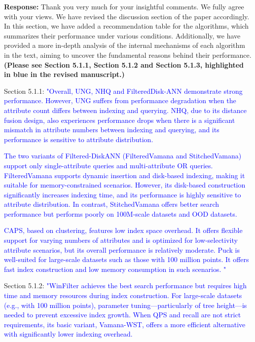 \documentclass[sigconf, nonacm]{acmart}
\newcounter{weakness}[section]
\begin{document}
\noindent
\textbf{Response:} 
%
Thank you very much for your insightful comments. We fully agree with your views. We have revised the discussion section of the paper accordingly. In this section, we have added a recommendation table for the algorithms, which summarizes their performance under various conditions. Additionally, we have provided a more in-depth analysis of the internal mechanisms of each algorithm in the text, aiming to uncover the fundamental reasons behind their performance.
\textbf{(Please see Section 5.1.1, Section 5.1.2 and Section 5.1.3, highlighted in blue in the revised manuscript.)}

Section 5.1.1:\textcolor{blue}{
	"Overall, UNG, NHQ and FilteredDisk-ANN demonstrate strong performance. However, UNG suffers from performance degradation when the attribute count differs between indexing and querying. NHQ, due to its distance fusion design, also experiences performance drops when there is a significant mismatch in attribute numbers between indexing and querying, and its performance is sensitive to attribute distribution. }

\textcolor{blue}{The two variants of Filtered-DiskANN (FilteredVamana and StitchedVamana) support only single-attribute queries and multi-attribute OR queries. FilteredVamana supports dynamic insertion and disk-based indexing, making it suitable for memory-constrained scenarios. However, its disk-based construction significantly increases indexing time, and its performance is highly sensitive to attribute distribution. In contrast, StitchedVamana offers better search performance but performs poorly on 100M-scale datasets and OOD datasets.}

\textcolor{blue}{
	CAPS, based on clustering, features low index space overhead. It offers flexible support for varying numbers of attributes and is optimized for low-selectivity attribute scenarios, but its overall performance is relatively moderate.
	Puck is well-suited for large-scale datasets such as those with 100 million points. It offers fast index construction and low memory consumption in such scenarios. "}


Section 5.1.2: \textcolor{blue}{
	"WinFilter achieves the best search performance but requires high time and memory resources during index construction. For large-scale datasets (e.g., with 100 million points), parameter tuning—particularly of tree height—is needed to prevent excessive index growth. When QPS and recall are not strict requirements, its basic variant, Vamana-WST, offers a more efficient alternative with significantly lower indexing overhead.
}
\end{document}
